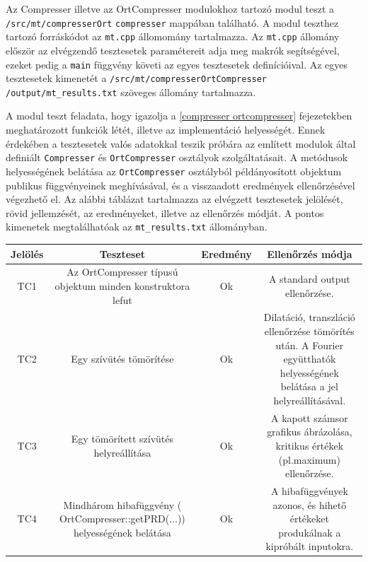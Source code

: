 \documentclass[oneside,titlepage,12pt,a4paper]{report}
\begin{document}
Az Compresser illetve az OrtCompresser modulokhoz tartozó modul teszt a \texttt{/src/mt/compresserOrt} \linebreak \texttt{compresser} mappában található. A modul teszthez tartozó forráskódot az \texttt{mt.cpp} állomomány tartalmazza. Az \texttt{mt.cpp} állomány először az elvégzendő tesztesetek paramétereit adja meg makrók segítségével, ezeket pedig a \texttt{main} függvény követi az egyes \linebreak  tesztesetek definícióival. Az egyes tesztesetek kimenetét a \texttt{/src/mt/compresserOrtCompresser} \linebreak  \texttt{/output/mt\_results.txt} szöveges állomány tartalmazza. 
\par A modul teszt feladata, hogy igazolja a \ref{compresser ortcompresser} fejezetekben meghatározott funkciók létét, illetve az implementáció helyességét. Ennek érdekében a tesztesetek valós adatokkal teszik próbára az említett modulok által definiált \texttt{Compresser} és \texttt{OrtCompresser} osztályok szolgáltatásait. A metódusok helyességének belátása az \texttt{OrtCompresser} osztályból példányosított objektum publikus függvényeinek meghívásával, és a visszaadott eredmények ellenőrzésével végezhető el. Az alábbi táblázat tartalmazza az elvégzett tesztesetek jelölését, rövid jellemzését, az eredményeket, illetve az ellenőrzés módját. A pontos kimenetek megtalálhatóak az \texttt{mt\_results.txt} állományban.

\begin{center}
\begin{adjustbox}{width=1\textwidth}
 \begin{tabular}{||c c c c||} 
 \hline
 Jelölés & Teszteset & Eredmény &  Ellenőrzés módja \\ [0.5ex] 
 \hline\hline
 TC1 & Az OrtCompresser típusú objektum minden konstruktora lefut &  Ok & A standard output ellenőrzése. \\ 
 \hline
 TC2 & Egy szívütés tömörítése &  Ok & Dilatáció, transzláció ellenőrzése tömörítés után. A Fourier együtthatók helyességének belátása a jel helyreállításával. \\
 \hline
 TC3 & Egy tömörített szívütés helyreállítása & Ok & A kapott számsor grafikus ábrázolása, kritikus értékek (pl.maximum) ellenőrzése. \\
 \hline
 TC4 & Mindhárom hibafüggvény ( OrtCompresser::getPRD(...)) helyességének belátása & Ok & A hibafüggvények azonos, és hihető értékeket produkálnak a kipróbált inputokra. \\
 \hline
\end{tabular}
\end{adjustbox}
\end{center}
\end{document}
